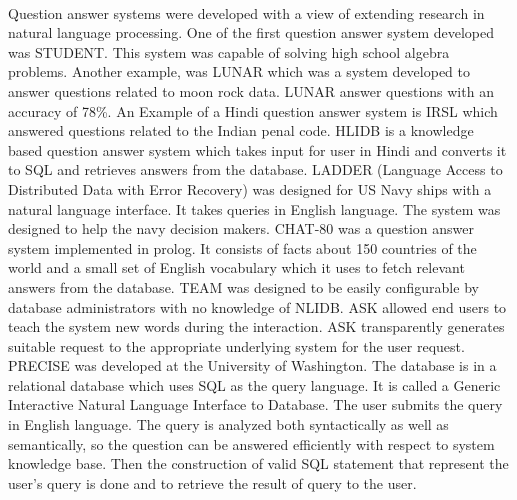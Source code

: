 \paragraph{}
Question answer systems were developed with a view of extending research in natural language processing. One of the first question answer system developed was STUDENT. This system was capable of solving high school algebra problems. Another example,  was LUNAR which was a system developed to answer questions related to moon rock data. LUNAR answer questions with an accuracy of 78\%. An Example of a Hindi question answer system is IRSL which answered questions related to the Indian penal code. HLIDB is a knowledge based question answer system which takes input for user in Hindi and converts it to SQL and retrieves answers from the database. LADDER (Language Access to Distributed Data with Error Recovery) was designed for US Navy ships with a natural language interface. It takes queries in English language. The system was designed to help the navy decision makers. CHAT-80 was a question answer system implemented in prolog. It consists of facts about 150 countries of the world and a small set of English vocabulary which it uses to fetch relevant answers from the database. TEAM was designed to be easily configurable by database administrators with no knowledge of NLIDB. ASK allowed end users to teach the system new words during the interaction. ASK transparently generates suitable request to the appropriate underlying system for the user request. PRECISE was developed at the University of Washington. The database is in a relational database which uses SQL as the query language. It is called a Generic Interactive Natural Language Interface to Database. The user submits the query in English language. The query is analyzed both syntactically as well as semantically, so the question can be answered efficiently with respect to system knowledge base. Then the construction of valid SQL statement that represent the user's query is done and to retrieve the result of query to the user.

